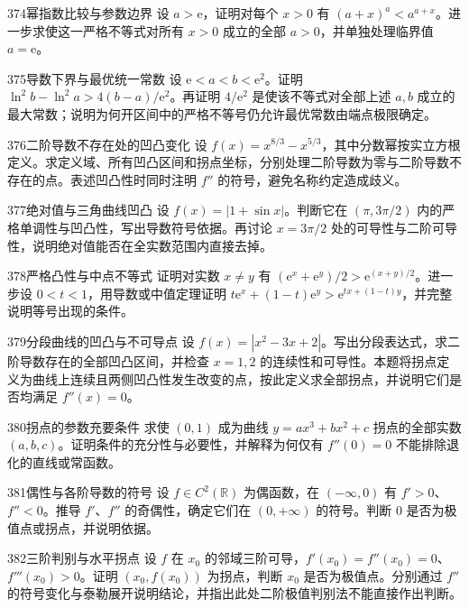 \begin{exercise}{374}{幂指数比较与参数边界}
设 $a>\mathrm e$，证明对每个 $x>0$ 有 $(a+x)^a<a^{a+x}$。进一步求使这一严格不等式对所有 $x>0$ 成立的全部 $a>0$，并单独处理临界值 $a=\mathrm e$。
\end{exercise}
\begin{exercise}{375}{导数下界与最优统一常数}
设 $\mathrm e<a<b<\mathrm e^2$。证明 $\ln^2b-\ln^2a>4(b-a)/\mathrm e^2$。再证明 $4/\mathrm e^2$ 是使该不等式对全部上述 $a,b$ 成立的最大常数；说明为何开区间中的严格不等号仍允许最优常数由端点极限确定。
\end{exercise}
\begin{exercise}{376}{二阶导数不存在处的凹凸变化}
设 $f(x)=x^{8/3}-x^{5/3}$，其中分数幂按实立方根定义。求定义域、所有凹凸区间和拐点坐标，分别处理二阶导数为零与二阶导数不存在的点。表述凹凸性时同时注明 $f''$ 的符号，避免名称约定造成歧义。
\end{exercise}
\begin{exercise}{377}{绝对值与三角曲线凹凸}
设 $f(x)=|1+\sin x|$。判断它在 $(\pi,3\pi/2)$ 内的严格单调性与凹凸性，写出导数符号依据。再讨论 $x=3\pi/2$ 处的可导性与二阶可导性，说明绝对值能否在全实数范围内直接去掉。
\end{exercise}
\begin{exercise}{378}{严格凸性与中点不等式}
证明对实数 $x\ne y$ 有 $(\mathrm e^x+\mathrm e^y)/2>\mathrm e^{(x+y)/2}$。进一步设 $0<t<1$，用导数或中值定理证明 $t\mathrm e^x+(1-t)\mathrm e^y>\mathrm e^{tx+(1-t)y}$，并完整说明等号出现的条件。
\end{exercise}
\begin{exercise}{379}{分段曲线的凹凸与不可导点}
设 $f(x)=|x^2-3x+2|$。写出分段表达式，求二阶导数存在的全部凹凸区间，并检查 $x=1,2$ 的连续性和可导性。本题将拐点定义为曲线上连续且两侧凹凸性发生改变的点，按此定义求全部拐点，并说明它们是否均满足 $f''(x)=0$。
\end{exercise}
\begin{exercise}{380}{拐点的参数充要条件}
求使 $(0,1)$ 成为曲线 $y=ax^3+bx^2+c$ 拐点的全部实数 $(a,b,c)$。证明条件的充分性与必要性，并解释为何仅有 $f''(0)=0$ 不能排除退化的直线或常函数。
\end{exercise}
\begin{exercise}{381}{偶性与各阶导数的符号}
设 $f\in C^2(\mathbb R)$ 为偶函数，在 $(-\infty,0)$ 有 $f'>0$、$f''<0$。推导 $f'$、$f''$ 的奇偶性，确定它们在 $(0,+\infty)$ 的符号。判断 $0$ 是否为极值点或拐点，并说明依据。
\end{exercise}
\begin{exercise}{382}{三阶判别与水平拐点}
设 $f$ 在 $x_0$ 的邻域三阶可导，$f'(x_0)=f''(x_0)=0$、$f'''(x_0)>0$。证明 $(x_0,f(x_0))$ 为拐点，判断 $x_0$ 是否为极值点。分别通过 $f''$ 的符号变化与泰勒展开说明结论，并指出此处二阶极值判别法不能直接作出判断。
\end{exercise}
